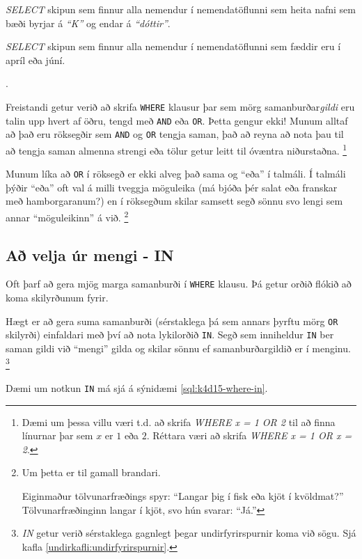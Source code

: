 \begin{example}
\caption[WHERE með AND]{\emph{SELECT} skipun sem finnur alla nemendur í nemendatöflunni sem heita nafni sem bæði byrjar á \emph{``K''} og endar á \emph{``dóttir''}.}
\label{sql:k4d13-where-and}
\centering
{}
\end{example}

\begin{example}
\caption[WHERE með OR]{\emph{SELECT} skipun sem finnur alla nemendur í nemendatöflunni sem fæddir eru í apríl eða júní.}
\label{sql:k4d14-where-or}.
\centering
{}
\end{example}

Freistandi getur verið að skrifa \verb|WHERE| klausur þar sem mörg samanburðar\emph{gildi} eru talin upp hvert af öðru, tengd með \verb|AND| eða \verb|OR|. Þetta gengur ekki! Munum alltaf að það eru röksegðir sem \verb|AND| og \verb|OR| tengja saman, það að reyna að nota þau til að tengja saman almenna strengi eða tölur getur leitt til óvæntra niðurstaðna. \footnote{Dæmi um þessa villu væri t.d. að skrifa \emph{WHERE x = 1 OR 2} til að finna línurnar þar sem $x$ er $1$ eða $2$. Réttara væri að skrifa \emph{WHERE x = 1 OR x = 2}.}

Munum líka að \verb|OR| í röksegð er ekki alveg það sama og ``eða'' í talmáli. Í talmáli þýðir ``eða'' oft val á milli tveggja möguleika (má bjóða þér salat eða franskar með hamborgaranum?) en í röksegðum skilar samsett segð sönnu svo lengi sem annar ``möguleikinn'' á við. \footnote{Um þetta er til gamall brandari.

Eiginmaður tölvunarfræðings spyr: ``Langar þig í fisk eða kjöt í kvöldmat?'' Tölvunarfræðinginn langar í kjöt, svo hún svarar: ``Já.''}
\subsection{Að velja úr mengi - IN} %
Oft þarf að gera mjög marga samanburði í \verb|WHERE| klausu. Þá getur orðið flókið að koma skilyrðunum fyrir.

Hægt er að gera suma samanburði (sérstaklega þá sem annars þyrftu mörg \verb|OR| skilyrði) einfaldari með því að nota lykilorðið \verb|IN|. Segð sem inniheldur \verb|IN| ber saman gildi við ``mengi'' gilda og skilar sönnu ef samanburðargildið er í menginu. \footnote{\emph{IN} getur verið sérstaklega gagnlegt þegar undirfyrirspurnir koma við sögu. Sjá kafla \ref{undirkafli:undirfyrirspurnir}.}

Dæmi um notkun \verb|IN| má sjá á sýnidæmi \ref{sql:k4d15-where-in}.

